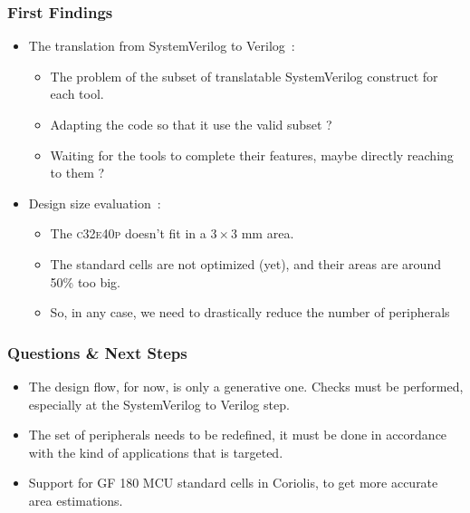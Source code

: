 \documentclass[10pt,aspectratio=169,presentation]{beamer}
\newcommand {\SV}            {SystemVerilog\xspace}
\newcommand {\Verilog}       {Verilog\xspace}
\newcommand {\CoreVRisc}     {\textsc{c32e40p}\xspace}
\begin{document}
   \begin{frame}
     \frametitle{First Findings}
     \vspace*{\baselineskip}
     \begin{itemize}
       \setlength\itemsep{1.0\baselineskip}
       \item The translation from \SV to \Verilog~:
       \begin{itemize}
         \item The problem of the subset of translatable \SV construct for each tool.
         \item Adapting the code so that it use the valid subset ?
         \item Waiting for the tools to complete their features, maybe directly
               reaching to them ?
       \end{itemize}
       \item Design size evaluation~:
       \begin{itemize}
         \item The \CoreVRisc doesn't fit in a $3 \times 3$ mm area.
         \item The standard cells are not optimized (yet), and their areas are
               around 50\% too big.
         \item So, in any case, we need to drastically reduce the number of
               peripherals
       \end{itemize}
     \end{itemize}
   \end{frame}


   \begin{frame}
     \frametitle{Questions \& Next Steps}
     \begin{itemize}
       \setlength\itemsep{1.0\baselineskip}
       \item The design flow, for now, is only a generative one. Checks must be
             performed, especially at the \SV to \Verilog step.
       \item The set of peripherals needs to be redefined, it must be done in
             accordance with the kind of applications that is targeted.
       \item Support for GF 180 MCU standard cells in Coriolis, to get more
             accurate area estimations.
     \end{itemize}
   \end{frame}
\end{document}
